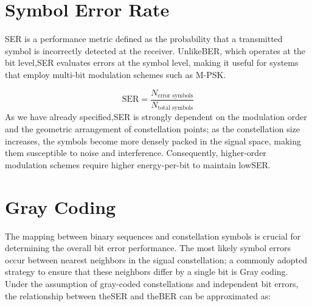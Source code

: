 \section{Symbol Error Rate}

\gls{SER} is a performance metric defined as the probability that a transmitted symbol is incorrectly detected at the receiver. Unlike\gls{BER}, which operates at the bit level,\gls{SER} evaluates errors at the symbol level, making it useful for systems that employ multi-bit modulation schemes such as M-\gls{PSK}.

\begin{equation}
    \label{eq:ser_definition}
    \text{SER} = \frac{N_{\text{error symbols}}}{N_{\text{total symbols}}}
\end{equation}
As we have already specified,\gls{SER} is strongly dependent on the modulation order and the geometric arrangement of constellation points; as the constellation size increases, the symbols become more densely packed in the signal space, making them susceptible to noise and interference. Consequently, higher-order modulation schemes require higher energy-per-bit to maintain low\gls{SER}.

\section{Gray Coding}
The mapping between binary sequences and constellation symbols is crucial for determining the overall bit error performance. The most likely symbol errors occur between nearest neighbors in the signal constellation; a commonly adopted strategy to ensure that these neighbors differ by a single bit is Gray coding.
Under the assumption of gray-coded constellations and independent bit errors, the relationship between the\gls{SER} and the\gls{BER} can be approximated as:

